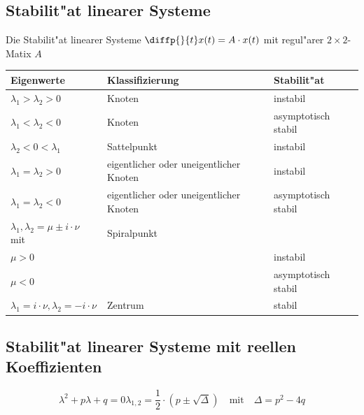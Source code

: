 \subsection{Stabilit"at linearer Systeme}
Die Stabilit"at linearer Systeme $\diffp{}{t}x(t) = A \cdot x(t)$ mit regul"arer $2 \times 2$-Matix $A$\\

\begin{tabular}{|l|l|l|}
	\hline
	\textbf{Eigenwerte}                                  & \textbf{Klassifizierung}                & \textbf{Stabilit"at} \\ \hline
	$\lambda_1 > \lambda_2 > 0$                          & Knoten                                  & instabil             \\ \hline
	$\lambda_1 < \lambda_2 < 0$                          & Knoten                                  & asymptotisch stabil  \\ \hline
	$\lambda_2 <  0 < \lambda_1 $                        & Sattelpunkt                             & instabil             \\ \hline
	$\lambda_1 = \lambda_2  > 0$                         & eigentlicher oder uneigentlicher Knoten & instabil             \\ \hline
	$\lambda_1 = \lambda_2 < 0$                          & eigentlicher oder uneigentlicher Knoten & asymptotisch stabil  \\ \hline
	$\lambda_1 , \lambda_2 = \mu \pm i \cdot \nu$ mit    & Spiralpunkt                             &  \\
	$\mu > 0$                                            &                                         & instabil             \\
	$\mu < 0$                                            &                                         & asymptotisch stabil  \\ \hline
	$\lambda_1 = i\cdot \nu ,  \lambda_2 = -i \cdot \nu$ & Zentrum                                 & stabil               \\ \hline
\end{tabular} 

\subsection{Stabilit"at linearer Systeme mit reellen Koeffizienten}
\begin{subequations}
	\begin{equation*}
		\lambda^2 + p \lambda + q = 0
	\end{equation*}
	\begin{equation*}
		\lambda_{1,2} = \frac{1}{2} \cdot (p \pm \sqrt{\Delta}) \quad \text{mit} \quad \Delta = p^2 -4q
	\end{equation*}
\end{subequations}\\ \\

